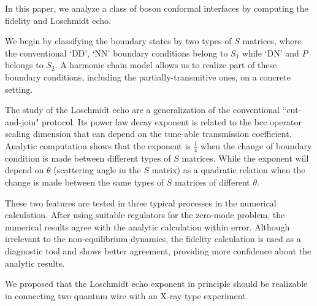 
In this paper, we analyze a class of boson conformal interfaces by computing the fidelity and Loschmidt echo. 

We begin by classifying the boundary states by two types of $S$ matrices, where the conventional `DD', `NN' boundary conditions belong to $S_1$ while `DN' and $P$ belongs to $S_2$. A harmonic chain model allows us to realize part of these boundary conditions, including the partially-transmitive ones, on a concrete setting. 

The study of the Loschmidt echo are a generalization of the conventional ``cut-and-join" protocol. Its power law decay exponent is related to the bcc operator scaling dimension that can depend on the tune-able transmission coefficient. Analytic computation shows that the exponent is $\frac{1}{4}$ when the change of boundary condition is made between different types of $S$ matrices. While the exponent will depend on $\theta$ (scattering angle in the $S$ matrix) as a quadratic relation when the change is made between the same types of $S$ matrices of different $\theta$.

These two features are tested in three typical processes in the numerical calculation. After using suitable regulators for the zero-mode problem, the numerical results agree with the analytic calculation within error. Although irrelevant to the non-equilibrium dynamics, the fidelity calculation is used as a diagnostic tool and shows better agreement, providing more confidence about the analytic results. 

We proposed that the Loschmidt echo exponent in principle should be realizable in connecting two quantum wire with an X-ray type experiment. 




